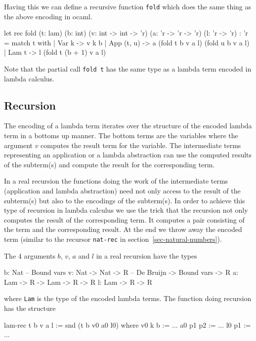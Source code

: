 \documentclass[12pt]{article}
\begin{document}
Having this we can define a recursive function {\tt fold} which does the same
thing as the above encoding in ocaml.
\begin{ocaml}
    let rec fold (t: lam) (b: int)
         (v: int -> int -> 'r)
         (a: 'r -> 'r -> 'r)
         (l: 'r -> 'r) : 'r =
        match t with
        | Var k ->
            v k b
        | App (t, u) ->
            a (fold t b v a l) (fold u b v a l)
        | Lam t ->
            l (fold t (b + 1) v a l)
\end{ocaml}
Note that the partial call {\tt fold t} has the same type as a lambda term
encoded in lambda calculus.




\subsection{Recursion}


The encoding of a lambda term iterates over the structure of the encoded lambda
term in a bottoms up manner. The bottom terms are the variables where the
argument $v$ computes the result term for the variable. The intermediate terms
representing an application or a lambda abstraction can use the computed
results of the subterm(s) and compute the result for the corresponding term.

In a real recursion the functions doing the work of the intermediate terms
(application and lambda abstraction) need not only access to the result of the
subterm(s) but also to the encodings of the subterm(s). In order to
achieve this type of recursion in lambda calculus we use the trick that the
recursion not only computes the result of the corresponding term. It computes a
pair consisting of the term and the corresponding result. At the end we throw
away the encoded term (similar to the recursor {\tt nat-rec} in
section~\ref{sec-natural-numbers}).

The 4 arguments $b$, $v$, $a$ and $l$ in a real recursion have the types
\begin{lam}
    b: Nat                  -- Bound vars
    v: Nat -> Nat -> R      -- De Bruijn -> Bound vars -> R
    a: Lam -> R -> Lam -> R -> R
    l: Lam -> R -> R
\end{lam}
where {\tt Lam} is the type of the encoded lambda terms. The function doing
recursion has the structure
\begin{lam}
    lam-rec t b v a l :=
        snd (t b v0 a0 l0) where
            v0 k b    :=  ...
            a0 p1 p2  :=  ...
            l0 p1     :=  ...
\end{lam}
\end{document}
